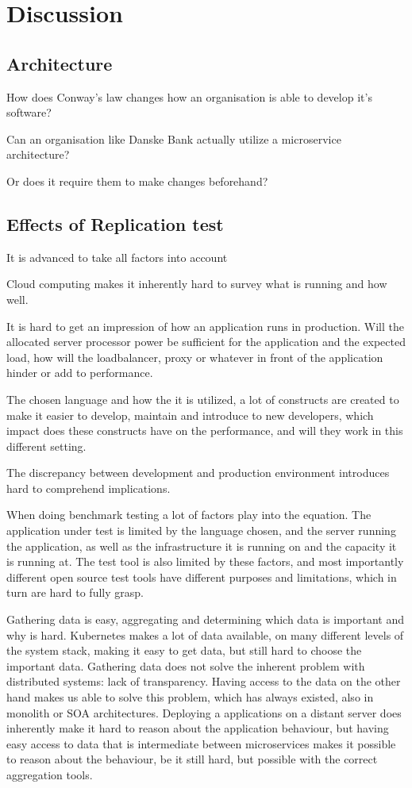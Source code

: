 \chapter{Discussion}
\label{ch:discussion}

\section{Architecture}
How does Conway's law changes how an organisation is able to develop it's software?

Can an organisation like Danske Bank actually utilize a microservice architecture?

Or does it require them to make changes beforehand?


\section{Effects of Replication test}
It is advanced to take all factors into account

Cloud computing makes it inherently hard to survey what is running and how well.

It is hard to get an impression of how an application runs in production. Will the allocated server processor power be sufficient for the application and the expected load, how will the loadbalancer, proxy or whatever in front of the application hinder or add to performance.

The chosen language and how the it is utilized, a lot of constructs are created to make it easier to develop, maintain and introduce to new developers, which impact does these constructs have on the performance, and will they work in this different setting.

The discrepancy between development and production environment introduces hard to comprehend implications.

When doing benchmark testing a lot of factors play into the equation. The application under test is limited by the language chosen, and the server running the application, as well as the infrastructure it is running on and the capacity it is running at. The test tool is also limited by these factors, and most importantly different open source test tools have different purposes and limitations, which in turn are hard to fully grasp.

Gathering data is easy, aggregating and determining which data is important and why is hard. Kubernetes makes a lot of data available, on many different levels of the system stack, making it easy to get data, but still hard to choose the important data. Gathering data does not solve the inherent problem with distributed systems: lack of transparency. Having access to the data on the other hand makes us able to solve this problem, which has always existed, also in monolith or SOA architectures. Deploying a applications on a distant server does inherently make it hard to reason about the application behaviour, but having easy access to data that is intermediate between microservices makes it possible to reason about the behaviour, be it still hard, but possible with the correct aggregation tools.

